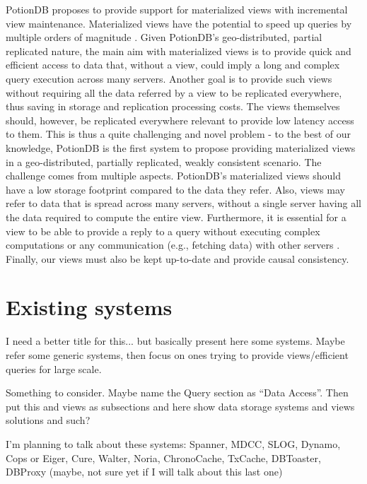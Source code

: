 PotionDB proposes to provide support for materialized views with incremental view maintenance.
Materialized views have the potential to speed up queries by multiple orders of magnitude \cite{partView, effMaintenance, lazyMaintenance}.
Given PotionDB's geo-distributed, partial replicated nature, the main aim with materialized views is to provide quick and efficient access to data that, without a view, could imply a long and complex query execution across many servers.
Another goal is to provide such views without requiring all the data referred by a view to be replicated everywhere, thus saving in storage and replication processing costs.
The views themselves should, however, be replicated everywhere relevant to provide low latency access to them.
This is thus a quite challenging and novel problem - to the best of our knowledge, PotionDB is the first system to propose providing materialized views in a geo-distributed, partially replicated, weakly consistent scenario.
The challenge comes from multiple aspects.
PotionDB's materialized views should have a low storage footprint compared to the data they refer.
Also, views may refer to data that is spread across many servers, without a single server having all the data required to compute the entire view.
Furthermore, it is essential for a view to be able to provide a reply to a query without executing complex computations or any communication (e.g., fetching data) with other servers .
Finally, our views must also be kept up-to-date and provide causal consistency.

\section{Existing systems}

I need a better title for this... but basically present here some systems. Maybe refer some generic systems, then focus on ones trying to provide views/efficient queries for large scale.

Something to consider. Maybe name the Query section as ``Data Access''. Then put this and views as subsections and here show data storage systems and views solutions and such?

I'm planning to talk about these systems: Spanner, MDCC, SLOG, Dynamo, Cops or Eiger, Cure, Walter, Noria, ChronoCache, TxCache, DBToaster, DBProxy (maybe, not sure yet if I will talk about this last one)

